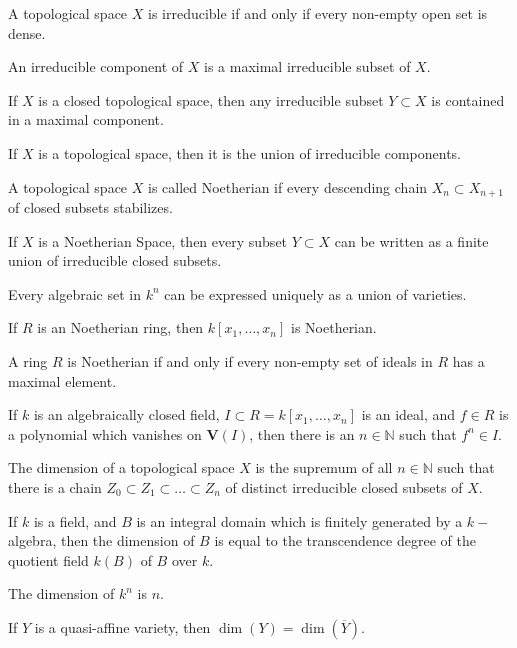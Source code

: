 \documentclass[crop=false,class=book,oneside]{standalone}
\begin{document}
\begin{theorem}
A topological space $X$ is irreducible if and only if every non-empty open set is dense.
\end{theorem}
\begin{definition}
An irreducible component of $X$ is a maximal irreducible subset of $X$.
\end{definition}
\begin{theorem}
If $X$ is a closed topological space, then any irreducible subset $Y\subset X$ is contained in a maximal component.
\end{theorem}
\begin{theorem}
If $X$ is a topological space, then it is the union of irreducible components.
\end{theorem}
\begin{definition}
A topological space $X$ is called Noetherian if every descending chain $X_n \subset X_{n+1}$ of closed subsets stabilizes.
\end{definition}
\begin{theorem}
If $X$ is a Noetherian Space, then every subset $Y\subset X$ can be written as a finite union of irreducible closed subsets.
\end{theorem}
\begin{theorem}
Every algebraic set in $k^n$ can be expressed uniquely as a union of varieties.
\end{theorem}
\begin{theorem}
If $R$ is an Noetherian ring, then $k[x_1,\hdots ,x_n]$ is Noetherian.
\end{theorem}
\begin{theorem}
A ring $R$ is Noetherian if and only if every non-empty set of ideals in $R$ has a maximal element.
\end{theorem}
\begin{theorem}
If $k$ is an algebraically closed field, $I\subset R = k[x_1,\hdots ,x_n]$ is an ideal, and $f\in R$ is a polynomial which vanishes on $\mathbf{V}(I)$, then there is an $n\in \mathbb{N}$ such that $f^n \in I$.
\end{theorem}
\begin{definition}
The dimension of a topological space $X$ is the supremum of all $n\in \mathbb{N}$ such that there is a chain $Z_0\subset Z_1\subset \hdots \subset Z_n$ of distinct irreducible closed subsets of $X$.
\end{definition}
\begin{theorem}
If $k$ is a field, and $B$ is an integral domain which is finitely generated by a $k-$algebra, then the dimension of $B$ is equal to the transcendence degree of the quotient field $k(B)$ of $B$ over $k$.
\end{theorem}
\begin{theorem}
The dimension of $k^n$ is $n$.
\end{theorem}
\begin{theorem}
If $Y$ is a quasi-affine variety, then $\dim(Y) = \dim(\overline{Y})$.
\end{theorem}
\end{document}
